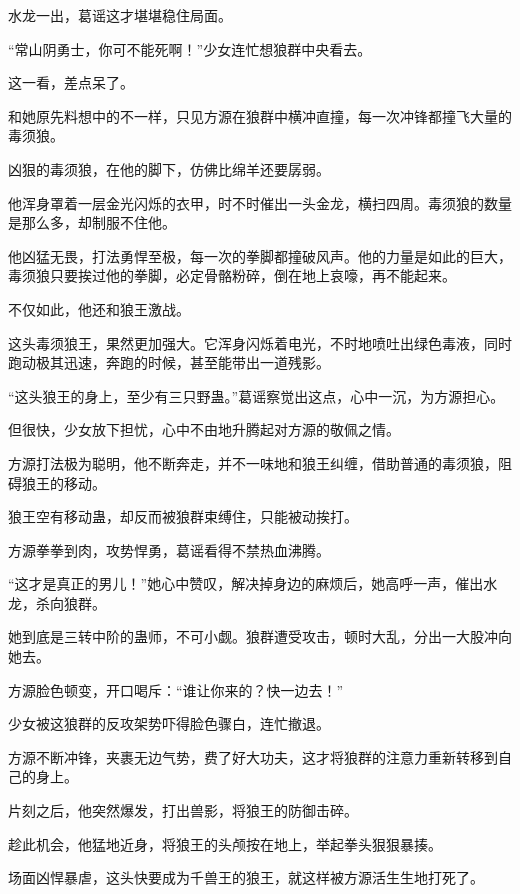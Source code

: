 \begin{this_body}
水龙一出，葛谣这才堪堪稳住局面。

“常山阴勇士，你可不能死啊！”少女连忙想狼群中央看去。

这一看，差点呆了。

和她原先料想中的不一样，只见方源在狼群中横冲直撞，每一次冲锋都撞飞大量的毒须狼。

凶狠的毒须狼，在他的脚下，仿佛比绵羊还要孱弱。

他浑身罩着一层金光闪烁的衣甲，时不时催出一头金龙，横扫四周。毒须狼的数量是那么多，却制服不住他。

他凶猛无畏，打法勇悍至极，每一次的拳脚都撞破风声。他的力量是如此的巨大，毒须狼只要挨过他的拳脚，必定骨骼粉碎，倒在地上哀嚎，再不能起来。

不仅如此，他还和狼王激战。

这头毒须狼王，果然更加强大。它浑身闪烁着电光，不时地喷吐出绿色毒液，同时跑动极其迅速，奔跑的时候，甚至能带出一道残影。

“这头狼王的身上，至少有三只野蛊。”葛谣察觉出这点，心中一沉，为方源担心。

但很快，少女放下担忧，心中不由地升腾起对方源的敬佩之情。

方源打法极为聪明，他不断奔走，并不一味地和狼王纠缠，借助普通的毒须狼，阻碍狼王的移动。

狼王空有移动蛊，却反而被狼群束缚住，只能被动挨打。

方源拳拳到肉，攻势悍勇，葛谣看得不禁热血沸腾。

“这才是真正的男儿！”她心中赞叹，解决掉身边的麻烦后，她高呼一声，催出水龙，杀向狼群。

她到底是三转中阶的蛊师，不可小觑。狼群遭受攻击，顿时大乱，分出一大股冲向她去。

方源脸色顿变，开口喝斥：“谁让你来的？快一边去！”

少女被这狼群的反攻架势吓得脸色骤白，连忙撤退。

方源不断冲锋，夹裹无边气势，费了好大功夫，这才将狼群的注意力重新转移到自己的身上。

片刻之后，他突然爆发，打出兽影，将狼王的防御击碎。

趁此机会，他猛地近身，将狼王的头颅按在地上，举起拳头狠狠暴揍。

场面凶悍暴虐，这头快要成为千兽王的狼王，就这样被方源活生生地打死了。

\end{this_body}

